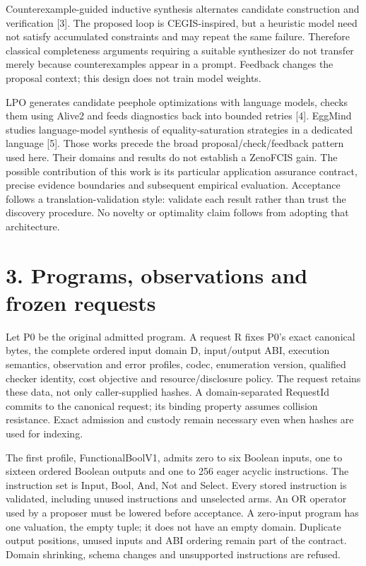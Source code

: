 \documentclass[11pt]{article}
\begin{document}
Counterexample-guided inductive synthesis alternates candidate construction and verification [3]. The proposed loop is CEGIS-inspired, but a heuristic model need not satisfy accumulated constraints and may repeat the same failure. Therefore classical completeness arguments requiring a suitable synthesizer do not transfer merely because counterexamples appear in a prompt. Feedback changes the proposal context; this design does not train model weights.

LPO generates candidate peephole optimizations with language models, checks them using Alive2 and feeds diagnostics back into bounded retries [4]. EggMind studies language-model synthesis of equality-saturation strategies in a dedicated language [5]. Those works precede the broad proposal/check/feedback pattern used here. Their domains and results do not establish a ZenoFCIS gain. The possible contribution of this work is its particular application assurance contract, precise evidence boundaries and subsequent empirical evaluation. Acceptance follows a translation-validation style: validate each result rather than trust the discovery procedure. No novelty or optimality claim follows from adopting that architecture.

\section{3. Programs, observations and frozen requests}

Let P0 be the original admitted program. A request R fixes P0's exact canonical bytes, the complete ordered input domain D, input/output ABI, execution semantics, observation and error profiles, codec, enumeration version, qualified checker identity, cost objective and resource/disclosure policy. The request retains these data, not only caller-supplied hashes. A domain-separated RequestId commits to the canonical request; its binding property assumes collision resistance. Exact admission and custody remain necessary even when hashes are used for indexing.

The first profile, FunctionalBoolV1, admits zero to six Boolean inputs, one to sixteen ordered Boolean outputs and one to 256 eager acyclic instructions. The instruction set is Input, Bool, And, Not and Select. Every stored instruction is validated, including unused instructions and unselected arms. An OR operator used by a proposer must be lowered before acceptance. A zero-input program has one valuation, the empty tuple; it does not have an empty domain. Duplicate output positions, unused inputs and ABI ordering remain part of the contract. Domain shrinking, schema changes and unsupported instructions are refused.
\end{document}
